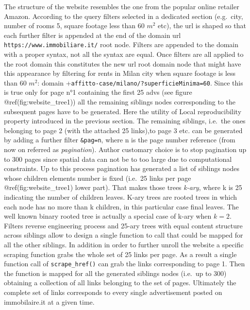 \documentclass[
  12pt,
  a4paper,
  oneside]{book}
\begin{document}
The structure of the website resembles the one from the popular online retailer Amazon. According to the query filters selected in a dedicated section (e.g.~city, number of rooms 5, square footage less than 60 \(m^2\) etc), the url is shaped so that each further filter is appended at the end of the domain url \texttt{https://www.immobiliare.it/} root node. Filters are appended to the domain with a proper syntax, not all the syntax are equal. Once filters are all applied to the root domain this constitutes the new url root domain node that might have this appearance by filtering for rents in Milan city when square footage is less than 60 \(m^2\): domain +\texttt{affitto-case/milano/?superficieMinima=60}. Since this is true only for page n°1 containing the first 25 advs (see figure @ref(fig:website\_tree1)) all the remaining siblings nodes corresponding to the subsequent pages have to be generated. Here the utility of Local reproducibility property introduced in the previous section. The remaining siblings, i.e.~the ones belonging to page 2 (with the attached 25 links),to page 3 etc. can be generated by adding a further filter \texttt{\&pag=n}, where n is the page number reference (from now on referred as \emph{pagination}). Author customary choice is to stop pagination up to 300 pages since spatial data can not be to too large due to computational constraints.
Up to this process pagination has generated a list of siblings nodes whose children elements number is fixed (i.e.~25 links per page @ref(fig:website\_tree1) lower part). That makes those trees \emph{k-ary}, where k is 25 indicating the number of children leaves. K-ary trees are rooted trees in which each node has no more than k children, in this particular case final leaves. The well known binary rooted tree is actually a special case of k-ary when \(k = 2\). Filters reverse engineering process and 25-ary trees with equal content structure across siblings allow to design a single function to call that could be mapped for all the other siblings. In addition in order to further unroll the website a specific scraping function grabs the whole set of 25 links per page. As a result a single function call of \texttt{scrape\_href()} can grab the links corresponding to page 1. Then the function is mapped for all the generated siblings nodes (i.e.~up to 300) obtaining a collection of all links belonging to the set of pages. Ultimately the complete set of links corresponds to every single advertisement posted on immobilaire.it at a given time.
\end{document}
